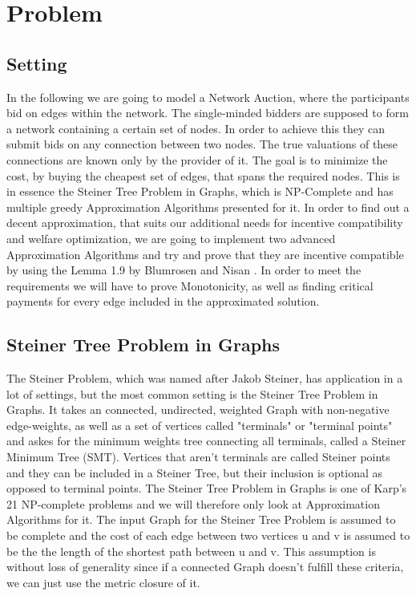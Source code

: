 
\chapter{Problem}\label{chapter:problem}

\section{Setting}

In the following we are going to model a Network Auction, where the participants bid on edges within the network. The single-minded bidders are supposed to form a network containing a certain set of nodes. In order to achieve this they can submit bids on any connection between two nodes. The true valuations of these connections are known only by the provider of it.  The goal is to minimize the cost, by buying the cheapest set of edges, that spans the required nodes. This is in essence the Steiner Tree Problem in Graphs, which is NP-Complete and has multiple greedy Approximation Algorithms presented for it. In order to find out a decent approximation, that suits our additional needs for incentive compatibility and welfare optimization, we are going to implement two advanced Approximation Algorithms and try and prove that they are incentive compatible by using the Lemma 1.9 by Blumrosen and Nisan \cite{BlNi07}. In order to meet the requirements we will have to prove Monotonicity, as well as finding critical payments for every edge included in the approximated solution.

\section{Steiner Tree Problem in Graphs}

The Steiner Problem, which was named after Jakob Steiner, has application in a lot of settings, but the most common setting is the Steiner Tree Problem in Graphs. It takes an connected, undirected, weighted Graph with non-negative edge-weights, as well as a set of vertices called "terminals" or "terminal points" and askes for the minimum weights tree connecting all terminals, called a Steiner Minimum Tree (SMT). Vertices that aren't terminals are called Steiner points and they can be included in a Steiner Tree, but their inclusion is optional as opposed to terminal points. The Steiner Tree Problem in Graphs is one of Karp's 21 NP-complete problems \cite{karp1972reducibility} and we will therefore only look at Approximation Algorithms for it. The input Graph for the Steiner Tree Problem is assumed to be complete and the cost of each edge between two vertices u and v is assumed to be the the length of the shortest path between u and v. This assumption is without loss of generality since if a connected Graph doesn't fulfill these criteria, we can just use the metric closure of it.

